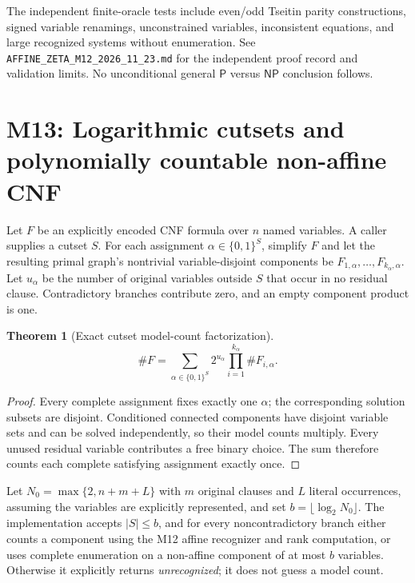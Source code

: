 \documentclass[11pt,a4paper]{article}
\newtheorem{theorem}{Theorem}
\begin{document}
The independent finite-oracle tests include even/odd
Tseitin parity constructions, signed variable renamings,
unconstrained variables, inconsistent equations, and large
recognized systems without enumeration.
See \texttt{AFFINE\_ZETA\_M12\_2026\_11\_23.md} for
the independent proof record and validation limits.
No unconditional general $\mathsf P$ versus $\mathsf{NP}$
conclusion follows.

\section{M13: Logarithmic cutsets and polynomially countable non-affine CNF}
Let $F$ be an explicitly encoded CNF formula over $n$ named
variables. A caller supplies a cutset $S$. For each assignment
$\alpha\in\{0,1\}^S$, simplify $F$ and let the resulting primal
graph's nontrivial variable-disjoint components be
$F_{1,\alpha},\ldots,F_{k_\alpha,\alpha}$.
Let $u_\alpha$ be the number of original variables outside $S$
that occur in no residual clause. Contradictory branches
contribute zero, and an empty component product is one.

\begin{theorem}[Exact cutset model-count factorization]
\[
\#F=\sum_{\alpha\in\{0,1\}^S}
2^{u_\alpha}\prod_{i=1}^{k_\alpha}\#F_{i,\alpha}.
\]
\end{theorem}
\begin{proof}
Every complete assignment fixes exactly one $\alpha$; the
corresponding solution subsets are disjoint. Conditioned
connected components have disjoint variable sets and can
be solved independently, so their model counts multiply.
Every unused residual variable contributes a free binary
choice. The sum therefore counts each complete satisfying
assignment exactly once.
\end{proof}

Let $N_0=\max\{2,n+m+L\}$ with $m$ original clauses and $L$
literal occurrences, assuming the variables are explicitly
represented, and set $b=\lfloor\log_2N_0\rfloor$.
The implementation accepts $|S|\le b$, and for every
noncontradictory branch either counts a component using
the M12 affine recognizer and rank computation, or uses
complete enumeration on a non-affine component of at most
$b$ variables. Otherwise it explicitly returns
\emph{unrecognized}; it does not guess a model count.
\end{document}
